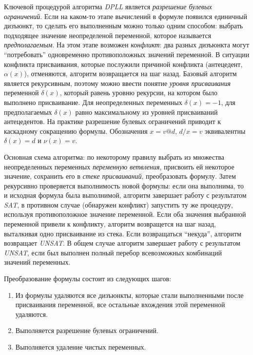 Ключевой процедурой алгоритма \textit{DPLL} является \textit{разрешение булевых ограничений}. 
Если на каком-то этапе вычислений в формуле появился единичный дизъюнкт, то сделать его выполненным можно только одним способом: выбрать подходящее значение неопределеной переменной, которое называется \textit{предполагаемым}. На этом этапе возможен \textit{конфликт}: 
два разных дизъюнкта могут \enquote{потребовать} одновременно противоположных значений переменной. В ситуации конфликта присваивания, 
которые послужили причиной конфликта (антецедент, $\alpha(x)$), отменяются, алгоритм возвращается на шаг назад. Базовый алгоритм является рекурсивным, поэтому можно ввести понятие \textit{уровня присваивания} переменной $\delta(x)$, который равень уровню рекурсии, на котором было выполнено присваивание. Для неопределенных переменных $\delta(x)=-1$, для предполагаемых $\delta(x)$ равно максимальному из уровней присваиваний антецедентов. На практике разрешение булевых ограничений приводит к каскадному сокращению формулы. 
Обозначения $x = v @ d$, $d/x=v$ эквивалентны $\delta(x) = d$ и $\nu(x) = v$.

Основная схема алгоритма: по некоторому правилу выбрать из множества неопределенных переменных \textit{переменную ветвления}, присвоить ей некоторое значение, сохранить его в \textit{стеке присваиваний}, преобразовать формулу. Затем рекурсивно проверяется выполнимость новой формулы: если она выполнима, то и исходная формула была выполнимой, алгоритм завершает работу с результатом \textit{SAT}, в противном случае (обнаружен конфликт) запустить ту же процедуру, используя противоположное значение переменной. 
Если оба значения выбранной переменной привели к конфликту, алгоритм возвращется на шаг назад, выталкивая одно присваивание из стека. Если возвращаться \enquote{некуда}, алгоритм возвращает \textit{UNSAT}. 
В общем случае алгоритм завершает работу с результатом \textit{UNSAT}, если был выполнен полный перебор всевозможных комбинаций значений переменных.

Преобразование формулы состоит из следующих шагов:
\begin{enumerate}[label=\arabic{*}.]
\item
Из формулы удаляются все дизъюнкты, которые стали выполненными после присваивания переменной, 
все остальные вхождения этой переменной удаляются.
\item Выполняется разрешение булевых ограничений.
\item Выполняется удаление чистых переменных.
\end{enumerate}

